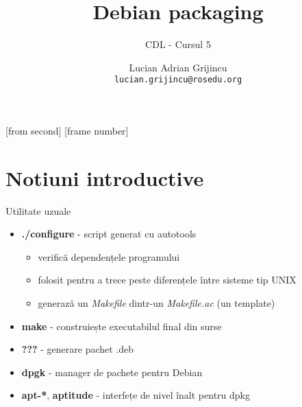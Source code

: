 \documentclass{beamer}
\title[Debian packaging]{Debian packaging}
\subtitle{CDL - Cursul 5}
\institute{ROSEdu}
\author{Lucian Adrian Grijincu \\ \texttt{lucian.grijincu@rosedu.org}}
\begin{document}
[from second]
[frame number]

\frame{\titlepage}

\frame{\tableofcontents}

\section{Notiuni introductive}

\frame{\tableofcontents[currentsection]}

\begin{frame}{Utilitate uzuale}
  \begin{itemize}
  \item \textbf{./configure} - script generat cu autotools
    \begin{itemize}
    \item verifică dependențele programului
    \item folosit pentru a trece peste diferențele între sisteme tip UNIX
    \item generază un \textit{Makefile} dintr-un \textit{Makefile.ac} (un template)
    \end{itemize}
  \item \textbf{make} - construiește executabilul final din surse
  \item \textbf{???} - generare pachet .deb
  \item \textbf{dpgk} - manager de pachete pentru Debian
  \item \textbf{apt-*}, \textbf{aptitude} - interfețe de nivel înalt pentru dpkg
  \end{itemize}
\end{frame}
\end{document}
